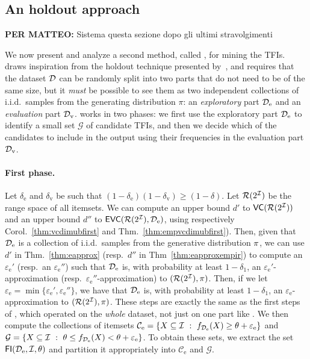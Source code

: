 \subsection{An holdout approach}\label{sec:holdout}

{\bf PER MATTEO: } Sistema questa sezione dopo gli ultimi stravolgimenti

We now present and analyze a second method, called \ALGHOLDOUT, for
mining the TFIs. \ALGHOLDOUT draws inspiration from the holdout technique
presented by~\citet{Webb07}, and requires that the dataset ${\cal D}$ can be
randomly split into two parts that do not need to be of the same size, but
it \emph{must} be possible to see them as two independent collections of
i.i.d.~samples from the generating distribution $\pi$: an \emph{exploratory}
part ${\cal D}_\mathrm{e}$ and an \emph{evaluation} part ${\cal D}_\mathrm{v}$.
\ALGHOLDOUT works in two phases: we first use the exploratory part
${\cal D}_\mathrm{e}$ to identify a small set $\mathcal{G}$ of candidate TFIs, and
then we decide which of the candidates to include in the output using their
frequencies in the evaluation part ${\cal D}_\mathrm{v}$.

\paragraph{First phase.} Let $\delta_\mathrm{e}$ and $\delta_\mathrm{v}$ be such
that $(1-\delta_\mathrm{e})(1-\delta_\mathrm{v})\ge(1-\delta)$. Let
$\mathcal{R}(2^{\cal I})$ be the range space of all itemsets. We can compute an upper
bound $d'$ to $\mathsf{VC}(\mathcal{R}(2^{\cal I}))$ and an upper bound $d''$ to
$\mathsf{EVC}(\mathcal{R}(2^{\cal I}),{\cal D}_\mathrm{e})$, using respectively
Corol.~\ref{thm:vcdimubfirst} and Thm.~\ref{thm:empvcdimubfirst}). Then, given
that ${\cal D}_\mathrm{e}$ is a collection of i.i.d.~samples from the generative
distribution $\pi$, we can use $d'$ in Thm.~\ref{thm:eapprox} (resp.~$d''$ in
Thm~\ref{thm:eapproxempir}) to compute an $\varepsilon_\mathrm{e}'$ (resp.~an
$\varepsilon_\mathrm{e}''$) such that ${\cal D}_\mathrm{e}$ is, with probability at
least $1-\delta_1$, an $\varepsilon_\mathrm{e}'$-approximation
(resp.~$\varepsilon_\mathrm{e}''$-approximation) to $(\mathcal{R}(2^{\cal I}),\pi)$.
Then, if we let
$\varepsilon_\mathrm{e}=\min\{\varepsilon_\mathrm{e}',\varepsilon_\mathrm{e}''\}$,
we have that ${\cal D}_\mathrm{e}$ is, with probability at least $1-\delta_1$, an
$\varepsilon_\mathrm{e}$-approximation to $(\mathcal{R}(2^{\cal I}),\pi)$. These steps
are exactly the same as the first steps of \ALG, which operated on the
\emph{whole} dataset, not just on one part like \ALGHOLDOUT. We then compute the
collections of itemsets $\mathcal{C}_\mathrm{e}=\{X\subseteq{\cal I} ~:~
f_{{\cal D}_\mathrm{e}}(X)\ge\theta+\varepsilon_\mathrm{e}\}$ and
$\mathcal{G}=\{X\subseteq{\cal I} ~:~ \theta\le
f_{{\cal D}_\mathrm{e}}(X)<\theta+\varepsilon_\mathrm{e}\}$. To obtain these sets, we
extract the set $\mathsf{FI}({\cal D}_\mathrm{e},{\cal I},\theta)$ and partition it appropriately
into $\mathcal{C}_\mathrm{e}$ and $\mathcal{G}$.

